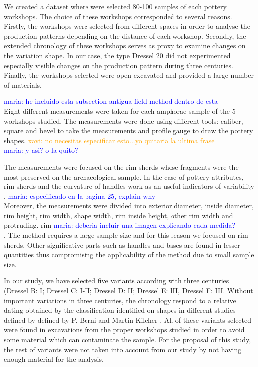 \documentclass[review]{elsarticle}
\newcommand{\memo}[2]{\textcolor{#1}{#2}}
\newcommand{\xavi}[1]{\memo{orange}{xavi: #1\\}}
\newcommand{\maria}[1]{\memo{blue}{maria: #1\\}}
\begin{document}
We created a dataset where were selected 80-100 samples of each pottery workshops. The choice of these workshops corresponded to several reasons. Firstly, the workshops were selected from different spaces in order to analyse the production patterns depending on the distance of each workshop. Secondly, the extended chronology of these workshops serves as proxy to examine changes on the variation shape. In our case, the type Dressel 20 did not experimented especially visible changes on the production pattern during three centuries.%
Finally, the workshops selected were open excavated and provided a large number of materials.   

\maria{he incluido esta subsection antigua field method dentro de esta}
Eight different measurements were taken for each amphorae sample of the 5 workshops studied. The measurements were done using different tools: caliber, square and bevel to take the measurements and profile gauge to draw the pottery shapes. \xavi{no necesitas especificar esto...yo quitaria la ultima frase} \maria{y asi? o la quito?}

The measurements were focused on the rim sherds whose fragments were the most preserved on the archaeological sample. In the case of pottery attributes, rim sherds and the curvature of handles work as an useful indicators of variability \citep{berni_millet_epigrafianforica_2008}. \maria{especificado en la pagina 25, explain why}
Moreover, the measurements were divided into exterior diameter, inside diameter, rim height, rim width, shape width, rim inside height, other rim width and protruding. rim \maria{deberia incluir una imagen explicando cada medida?}. The method requires a large sample size and for this reason we focused on rim sherds. Other significative parts such as handles and bases are found in lesser quantities thus compromising the applicability of the method due to small sample size.

In our study, we have selected five variants according with three centuries
(Dressel B: I; Dressel C: I-II; Dressel D: II; Dressel E: III, Dressel F: III. Without important variations in three centuries, the chronology respond to a relative dating obtained by the classification identified on shapes in different studies defined by defined by P. Berni \citep{berni_millet_epigrafianforica_2008} and Martin Kilcher \citep{martin-kilcher_romischen_1994}. All of these variants selected were found in excavations from the proper workshops studied in order to avoid some material which can contaminate the sample. For the proposal of this study, the rest of variants were not taken into account from our study by not having enough material for the analysis. 
\end{document}
